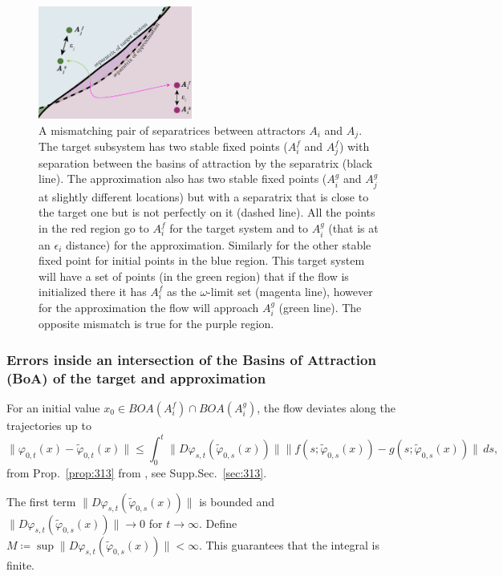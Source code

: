 \documentclass{article}
\theoremstyle{definition}
\theoremstyle{remark}
\newcounter{ct}
\begin{document}
\setlength\belowcaptionskip{-1ex}
\begin{figure}
  \centering
  \includegraphics[width=0.45\textwidth]{separatrices}
  \caption{
	A mismatching pair of separatrices between attractors $A_i$ and $A_j$.
	The target subsystem has two stable fixed points ($A_i^f$ and $A_j^f$) with separation between the basins of attraction by the separatrix (black line).
	The approximation also has two stable fixed points ($A_i^g$ and $A_j^g$ at slightly different locations) but with a separatrix that is close to the target one but is not perfectly on it (dashed line).
	All the points in the red region go to $A_i^f$ for the target system and to $A_i^g$ (that is at an $\epsilon_i$ distance) for the approximation. Similarly for the other stable fixed point for initial points in the blue region.
	This target system will have a set of points (in the green region) that if the flow is initialized there it has $A_i^f$ as the $\omega$-limit set (magenta line), however for the approximation the flow will approach $A_i^g$ (green line).
	The opposite mismatch is true for the purple region.
  }\label{fig:separatrices}
\end{figure}

\subsubsection{Errors inside an intersection of the Basins of Attraction (BoA) of the target and approximation}\label{sec:inboa_approx}
For an initial value $x_0\in BOA(A_i^f) \cap BOA(A_i^g)$, the flow deviates along the trajectories up to 
\[
\|\varphi_{0,t}(x) - \tilde{\varphi}_{0,t}(x)\| \leq \int_0^t \|D\varphi_{s,t}(\tilde{\varphi}_{0,s}(x))\| \|f(s; \tilde{\varphi}_{0,s}(x)) - g(s; \tilde{\varphi}_{0,s}(x))\| \, ds,
\]
from Prop.~\ref{prop:313} from \citep{vanhandel2007filtering}, see Supp.Sec.~\ref{sec:313}.
%

The first term \(\|D\varphi_{s,t}(\tilde{\varphi}_{0,s}(x))\|\) is bounded %
and \(\|D\varphi_{s,t}(\tilde{\varphi}_{0,s}(x))\|\rightarrow 0\) for \(t\rightarrow\infty\).
Define $M\coloneqq \sup \|D\varphi_{s,t}(\tilde{\varphi}_{0,s}(x))\|<\infty$. 
%
This guarantees that the integral is finite.
\end{document}

